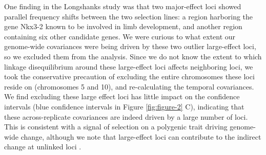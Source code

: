 \documentclass[11pt]{article}
\begin{document}
One finding in the Longshanks study was that two major-effect loci showed
parallel frequency shifts between the two selection lines: a region harboring
the gene Nkx3-2 known to be involved in limb development, and another region
containing six other candidate genes. We were curious to what extent our
genome-wide covariances were being driven by these two outlier large-effect
loci, so we excluded them from the analysis. Since we do not know the extent to
which linkage disequilibrium around these large-effect loci affects neighboring
loci, we took the conservative precaution of excluding the entire chromosomes
these loci reside on (chromosomes 5 and 10), and re-calculating the temporal
covariances. We find excluding these large effect loci has little impact on the
confidence intervals (blue confidence intervals in Figure \ref{fig:figure-2} C),
indicating that these across-replicate covariances are indeed driven by a large
number of loci. This is consistent with a signal of selection on a polygenic
trait driving genome-wide change, although we note that large-effect loci can
contribute to the indirect change at unlinked loci
\parencite{Robertson1961-ho,Santiago1995-hx}. 
\end{document}
